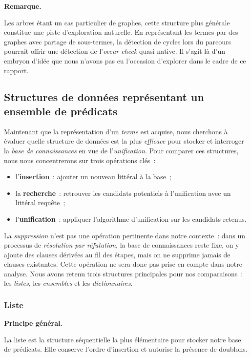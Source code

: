 \documentclass[11pt]{article}
\newenvironment{paraph}[1]{%
  \medskip
  \noindent\textbf{#1.}\quad

  \vspace{0.2cm}
}{%
  \medskip
}
\newenvironment{remarque}{%
    \begin{mdframed}[
        linecolor=sectioncolor!40,
        linewidth=0.8pt,
        backgroundcolor=sectioncolor!5,
        innerleftmargin=10pt,
        innerrightmargin=10pt,
        innertopmargin=6pt,
        innerbottommargin=6pt,
        skipabove=8pt,
        skipbelow=8pt
    ]
    \noindent\textbf{\small\color{sectioncolor}Remarque.}\enspace\small\itshape
}{%
    \end{mdframed}
}
\begin{document}
\begin{remarque}
    Les arbres étant un cas particulier de graphes, cette structure plus 
    générale constitue une piste d'exploration naturelle. En représentant 
    les termes par des graphes avec partage de sous-termes, la détection 
    de cycles lors du parcours pourrait offrir une détection de 
    l'\emph{occur-check} quasi-native. Il s'agit là d'un embryon d'idée 
    que nous n'avons pas eu l'occasion d'explorer dans le cadre de ce rapport.
\end{remarque}

\subsection{Structures de données représentant un ensemble de prédicats}
Maintenant que la représentation d'un \textit{terme} est acquise, 
nous cherchons à évaluer quelle structure de données est la 
plus \textit{efficace} pour stocker et interroger la 
\textit{base de connaissances} en vue de l'\textit{unification}. 
Pour comparer ces structures, nous nous concentrerons sur trois 
opérations clés~:

\begin{itemize}
    \item l'\textbf{insertion}~: ajouter un nouveau littéral 
    à la base~;
    \item la \textbf{recherche}~: retrouver les candidats 
    potentiels à l'unification avec un littéral requête~;
    \item l'\textbf{unification}~: appliquer l'algorithme 
    d'unification sur les candidats retenus.
\end{itemize}

\vspace{0.2cm}
La \textit{suppression} n'est pas une opération pertinente dans 
notre contexte~: dans un processus de \textit{résolution par 
réfutation}, la base de connaissances reste fixe, on y ajoute 
des clauses dérivées au fil des étapes, mais on ne supprime jamais 
de clauses existantes. Cette opération ne sera donc pas prise en 
compte dans notre analyse. Nous avons retenu trois structures 
principales pour nos comparaisons~: les \textit{listes}, 
les \textit{ensembles} et les \textit{dictionnaires}.

\subsubsection{Liste}

\begin{paraph}{Principe général}
    La liste est la structure séquentielle la plus élémentaire 
    pour stocker notre base de prédicats. Elle conserve l'ordre 
    d'insertion et autorise la présence de doublons. 
\end{paraph}
\end{document}
